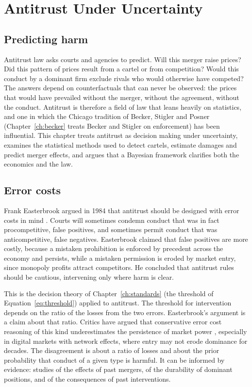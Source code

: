 \chapter{Antitrust Under Uncertainty}
\label{ch:antitrust}

\section{Predicting harm}

Antitrust law asks courts and agencies to predict. Will this merger raise prices? Did this pattern of prices result from a cartel or from competition? Would this conduct by a dominant firm exclude rivals who would otherwise have competed? The answers depend on counterfactuals that can never be observed: the prices that would have prevailed without the merger, without the agreement, without the conduct. Antitrust is therefore a field of law that leans heavily on statistics, and one in which the Chicago tradition of Becker, Stigler and Posner (Chapter~\ref{ch:becker} treats Becker and Stigler on enforcement) has been influential. This chapter treats antitrust as decision making under uncertainty, examines the statistical methods used to detect cartels, estimate damages and predict merger effects, and argues that a Bayesian framework clarifies both the economics and the law.

\section{Error costs}

Frank Easterbrook argued in 1984 that antitrust should be designed with error costs in mind \citep{easterbrook1984}. Courts will sometimes condemn conduct that was in fact procompetitive, false positives, and sometimes permit conduct that was anticompetitive, false negatives. Easterbrook claimed that false positives are more costly, because a mistaken prohibition is enforced by precedent across the economy and persists, while a mistaken permission is eroded by market entry, since monopoly profits attract competitors. He concluded that antitrust rules should be cautious, intervening only where harm is clear.

This is the decision theory of Chapter~\ref{ch:standards} (the threshold of Equation~\eqref{eq:threshold}) applied to antitrust. The threshold for intervention depends on the ratio of the losses from the two errors. Easterbrook's argument is a claim about that ratio. Critics have argued that conservative error cost reasoning of this kind underestimates the persistence of market power \citep{baker2015}, especially in digital markets with network effects, where entry may not erode dominance for decades. The disagreement is about a ratio of losses and about the prior probability that conduct of a given type is harmful. It can be informed by evidence: studies of the effects of past mergers, of the durability of dominant positions, and of the consequences of past interventions.

